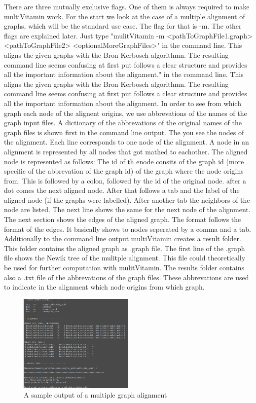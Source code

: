 \documentclass{SeminarV2}
\begin{document}
There are three mutually exclusive flags. One of them is always
required to make multiVitamin work. For the start we look at the
case of a multiple alignment of graphs, which will be the standard use case.
The flag for that is -m. The other flags are explained later.
Just type "mulitVitamin -m <pathToGraphFile1.graph> <pathToGraphFile2> <optionalMoreGraphFiles>"
in the command line. This aligns the given graphs with the Bron Kerbosch algorithmn.
The resulting command line seems confusing at first put follows a clear structure
and provides all the important information about the alignment."
in the command line. This aligns the given graphs with the Bron Kerbosch algorithmn.
The resulting command line seems confusing at first put follows a clear structure
and provides all the important information about the alignment.
In order to see from which graph each node of the alignent origins, we use
abbrevations of the names of the graph input files. A dictionary of the abbrevations
of the original names of the graph files is shown first in the command line output.
The you see the nodes of the alignment. Each line corresponds to one node
of the alignment. A node in an alignment is represented by all nodes that got mathed
to eachother. The aligned node is represented as follows:
The id of th enode consits of the graph id (more specific of the abbrevation of the graph id) of the
graph where the node origins from. This is followed by a colon, followed by the id
of the original node. after a dot comes the next aligned node. After that
 follows a tab and the label of the aligned node (if the graphs were labelled).
After another tab the neighbors of the node are listed. The next line shows
the same for the next node of the alignment.\\
The next section shows the edges of the aligned graph. The format follows the format
of the edges. It basically shows to nodes seperated by a comma and a tab. \\
Additionally to the command line output multiVitamin creates a result folder.
This folder contains the aligned graph as .graph file. The first line of the
.graph file shows the Newik tree of the mulitple alignment.
This file could theoretically
be used for further computation with mulitVitamin. The results folder contains
also a .txt file of the abbrevations of the graph files. These abbrevations are
used to indicate in the alignment which node origins from which graph.\\
\begin{figure}
     \includegraphics[width=0.5\textwidth]{multiOUT.png}
  \caption{A sample output of a multiple graph alignment}
\end{figure}
\end{document}
